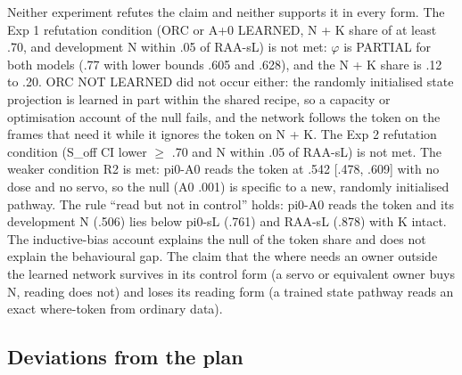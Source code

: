 Neither experiment refutes the claim and neither supports it in every form. The Exp 1 refutation condition (ORC or A+0 LEARNED, N + K share of at least .70, and development N within .05 of RAA-sL) is not met: $\varphi$ is PARTIAL for both models (.77 with lower bounds .605 and .628), and the N + K share is .12 to .20. ORC NOT LEARNED did not occur either: the randomly initialised state projection is learned in part within the shared recipe, so a capacity or optimisation account of the \pifive{} null fails, and the network follows the token on the frames that need it while it ignores the token on N + K. The Exp 2 refutation condition (S\_off CI lower $\geq$ .70 and N within .05 of RAA-sL) is not met. The weaker condition R2 is met: pi0-A0 reads the token at .542 [.478, .609] with no dose and no servo, so the \pifive{} null (A0 \mi.001) is specific to a new, randomly initialised pathway. The rule ``read but not in control'' holds: pi0-A0 reads the token and its development N (.506) lies below pi0-sL (.761) and RAA-sL (.878) with K intact. The inductive-bias account explains the \pifive{} null of the token share and does not explain the behavioural gap. The claim that the where needs an owner outside the learned network survives in its control form (a servo or equivalent owner buys N, reading does not) and loses its reading form (a trained state pathway reads an exact where-token from ordinary data).

\subsection{Deviations from the plan}
\label{app:K6}

